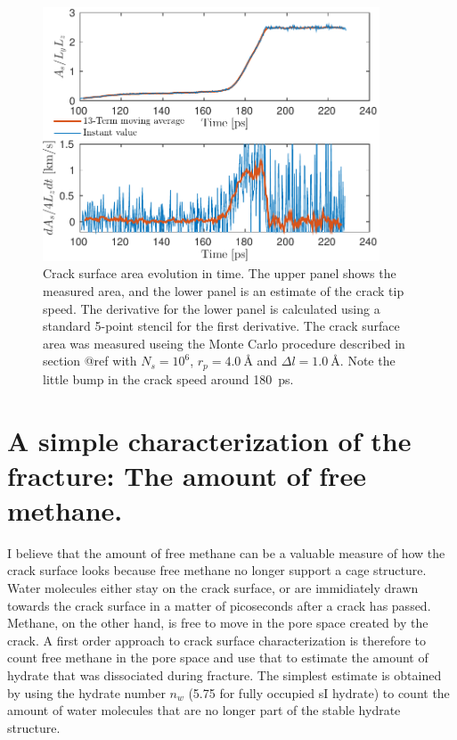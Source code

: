 \begin{figure}
\centering
\includegraphics[width=10cm]{../figures/thesis/crack_area_evolution_1048.pdf}
\caption{Crack surface area evolution in time. The upper panel shows the measured area, and the lower panel is an estimate of the crack tip speed. The derivative for the lower panel is calculated using a standard 5-point stencil for the first derivative. The crack surface area was measured useing the Monte Carlo procedure described in section @ref with $N_s = 10^6$, $r_p = \SI{4.0}{\angstrom}$ and $\Delta l = \SI{1.0}{\angstrom}$. Note the little bump in the crack speed around \SI{180}{\pico\second}.}
\label{fig:crack_area_evolution_1048}
\end{figure}


\section{A simple characterization of the fracture: The amount of free methane.}
I believe that the amount of free methane can be a valuable measure of how the crack surface looks because free methane no longer support a cage structure. Water molecules either stay on the crack surface, or are immidiately drawn towards the crack surface in a matter of picoseconds after a crack has passed. Methane, on the other hand, is free to move in the pore space created by the crack. A first order approach to crack surface characterization is therefore to count free methane in the pore space and use that to estimate the amount of hydrate that was dissociated during fracture. The simplest estimate is obtained by using the hydrate number $n_w$ (5.75 for fully occupied sI hydrate) to count the amount of water molecules that are no longer part of the stable hydrate structure. 


